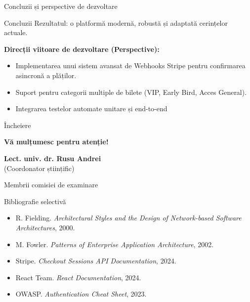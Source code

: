 \documentclass[aspectratio=169,12pt]{beamer}
\begin{document}
	\begin{frame}{Concluzii și perspective de dezvoltare}
		\begin{block}{Concluzii}
			Rezultatul: o platformă modernă, robustă și adaptată cerințelor actuale.
		\end{block}
		\vspace{0.2cm}
		\textbf{Direcții viitoare de dezvoltare (Perspective):}
		\begin{itemize}
			\item Implementarea unui sistem avansat de Webhooks Stripe pentru confirmarea asincronă a plăților.
			\item Suport pentru categorii multiple de bilete (VIP, Early Bird, Acces General).
			\item Integrarea testelor automate unitare și end-to-end
		\end{itemize}
	\end{frame}
	
	\begin{frame}{Încheiere}
		\begin{center}
			\Large \textbf{Vă mulțumesc pentru atenție!}
			\vspace{0.8cm}
			
			\normalsize
			\textbf{Lect. univ. dr. Rusu Andrei}\\
			(Coordonator științific)
			\vspace{0.5cm}
			
			Membrii comisiei de examinare\\
		
		\end{center}
	\end{frame}
	
	\begin{frame}[allowframebreaks]{Bibliografie selectivă}
		\footnotesize
		\begin{itemize}
			\item R. Fielding. \textit{Architectural Styles and the Design of Network-based Software Architectures}, 2000.
			\item M. Fowler. \textit{Patterns of Enterprise Application Architecture}, 2002.
			\item Stripe. \textit{Checkout Sessions API Documentation}, 2024.
			\item React Team. \textit{React Documentation}, 2024.
			\item OWASP. \textit{Authentication Cheat Sheet}, 2023.
		\end{itemize}
	\end{frame}
	
\end{document}

